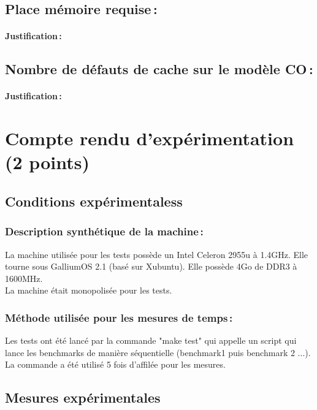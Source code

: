 \documentclass[a4paper, 10pt, french]{article}
\begin{document}
  \subsection{Place mémoire requise\,: }
    \paragraph{Justification\,: }

  \subsection{Nombre de défauts de cache sur le modèle CO\,: }
    \paragraph{Justification\,: }


\section{Compte rendu d'expérimentation (2 points)}
  \subsection{Conditions expérimentaless}

    \subsubsection{Description synthétique de la machine\,:} 
	La machine utilisée pour les tests possède un Intel Celeron 2955u à 1.4GHz. Elle tourne sous GalliumOS 2.1 (basé sur Xubuntu). Elle possède 4Go de DDR3 à 1600MHz. \\
	La machine était monopolisée pour les tests.

    \subsubsection{Méthode utilisée pour les mesures de temps\,: } 
    Les tests ont été lancé par la commande "make test" qui appelle un script qui lance les benchmarks de manière séquentielle (benchmark1 puis benchmark 2 ...).
    La commande a été utilisé 5 fois d'affilée pour les mesures.

  \subsection{Mesures expérimentales}
\end{document}
